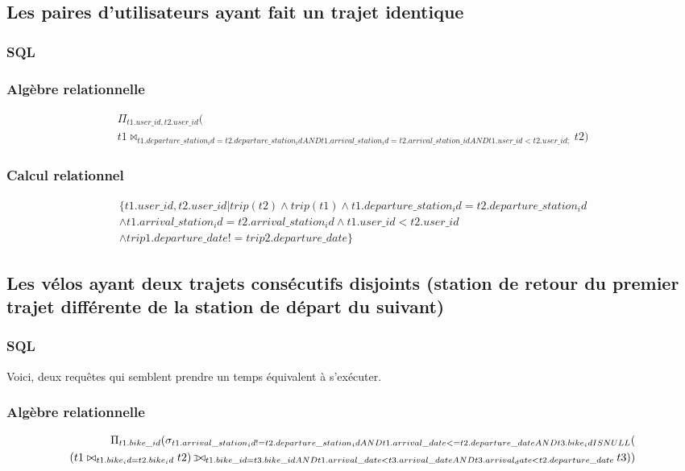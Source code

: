 \documentclass[a4paper,10pt]{article}
\def\ojoin{\setbox0=\hbox{$\bowtie$}%
  \rule[-.02ex]{.25em}{.4pt}\llap{\rule[\ht0]{.25em}{.4pt}}}
\def\leftouterjoin{\mathbin{\ojoin\mkern-5.8mu\bowtie}}
\begin{document}
\subsection{Les paires d'utilisateurs ayant fait un trajet identique}
\subsubsection{SQL}

\subsubsection{Algèbre relationnelle}
\begin{align}
\Pi_{t1.user\_id, t2.user\_id}( \\t1 \bowtie_{t1.departure\_station_id = t2.departure\_station_id
AND t1.arrival\_station_id = t2.arrival\_station\_id AND t1.user\_id < t2.user\_id;
} t2)
\end{align}
\subsubsection{Calcul relationnel}
\begin{align}
	\{ t1.user\_id, t2.user\_id | trip(t2) \wedge trip(t1) \wedge t1.departure\_station_id = t2.departure\_station_id \\ \wedge t1.arrival\_station_id = t2.arrival\_station_id \wedge t1.user\_id < t2.user\_id \\ \wedge trip1.departure\_date != trip2.departure\_date \}
\end{align}


\subsection{Les vélos ayant deux trajets consécutifs disjoints (station de retour du premier trajet différente de la station de départ du suivant)}
\subsubsection{SQL}
Voici, deux requêtes qui semblent prendre un temps équivalent à s'exécuter.


\subsubsection{Algèbre relationnelle}
\begin{align}
\Pi_{t1.bike\_id}(\sigma_{t1.arrival\_station_id != t2.departure\_station_id
       AND t1.arrival\_date <= t2.departure\_date
       AND t3.bike_id IS NULL}( \\ (t1 \bowtie_{t1.bike_id = t2.bike_id} t2)\leftouterjoin_{t1.bike\_id = t3.bike\_id AND t1.arrival\_date < t3.arrival\_date AND t3.arrival_date < t2.departure\_date} t3))
\end{align}
\end{document}
